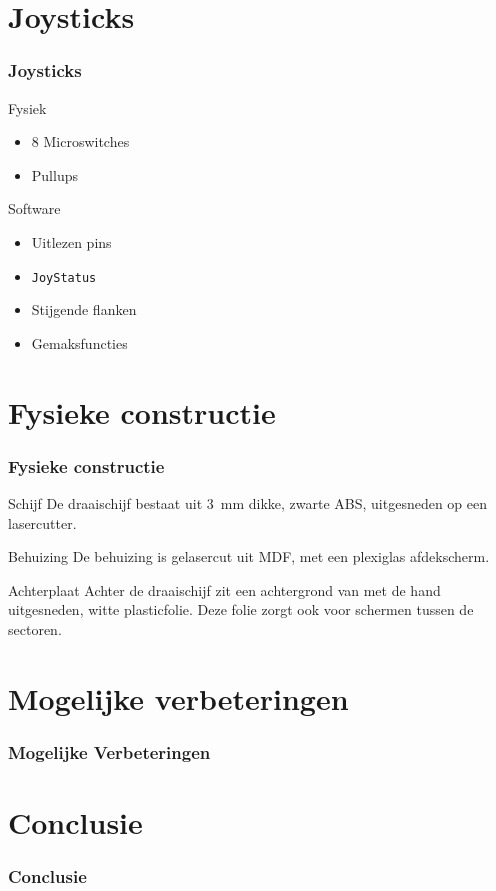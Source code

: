 \documentclass{beamer}
\begin{document}
\section{Joysticks}
\begin{frame}
  \frametitle{Joysticks}

  \begin{block}{Fysiek}
    \begin{itemize}
    \item 8 Microswitches
    \item Pullups
    \end{itemize}
  \end{block}

  \begin{block}{Software}
    \begin{itemize}
    \item Uitlezen pins
    \item \texttt{JoyStatus}
    \item Stijgende flanken
    \item Gemaksfuncties
    \end{itemize}
  \end{block}
\end{frame}

\section{Fysieke constructie}
\begin{frame}
  \frametitle{Fysieke constructie}

  \begin{block}{Schijf}
    De draaischijf bestaat uit \SI{3}{\milli\metre} dikke, zwarte ABS,
    uitgesneden op een lasercutter.
  \end{block}

  \begin{block}{Behuizing}
    De behuizing is gelasercut uit MDF, met een plexiglas afdekscherm.
  \end{block}

  \begin{block}{Achterplaat}
    Achter de draaischijf zit een achtergrond van met de hand uitgesneden, witte
    plasticfolie. Deze folie zorgt ook voor schermen tussen de sectoren.
  \end{block}
\end{frame}

\section{Mogelijke verbeteringen}
\begin{frame}
  \frametitle{Mogelijke Verbeteringen}

\end{frame}

\section{Conclusie}
\begin{frame}
  \frametitle{Conclusie}

\end{frame}
\end{document}
